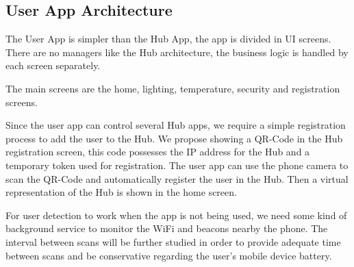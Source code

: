 \subsection{User App Architecture}
The User App is simpler than the Hub App, the app is divided in \ac{UI} screens. There are no managers like the Hub architecture, the business logic is handled by each screen separately. 


The main screens are the home, lighting, temperature, security and registration screens.

Since the user app can control several Hub apps, we require a simple registration process to add the user to the Hub. We propose showing a QR-Code in the Hub registration screen, this code possesses the \ac{IP } address for the Hub and a temporary token used for registration. The user app can use the phone camera to scan the QR-Code and automatically register the user in the Hub. Then a virtual representation of the Hub is shown in the home screen.

For user detection to work when the app is not being used, we need some kind of background service to monitor the \ac{WiFi} and beacons nearby the phone. The interval between scans will be further studied in order to provide adequate time between scans and be conservative regarding the user's mobile device battery.



